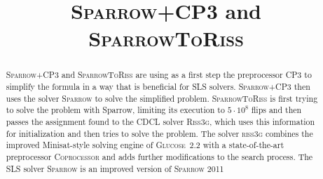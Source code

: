 \documentclass[conference]{IEEEtran}
\begin{document}
	
\title{\textsc{Sparrow+CP3} and \textsc{SparrowToRiss}}


\author{
\and
{}
}



\def\cp{\textsc{Coprocessor}\xspace}
\def\cpt{\textsc{CP3}\xspace}
\def\glucose{\textsc{Glucose~2.2}\xspace}
\def\minisat{\textsc{Minisat~2.2}\xspace}
\def\riss{\textsc{Riss3g}\xspace}
\def\sparrow{\textsc{Sparrow}\xspace}
\def\scp{\textsc{Sparrow+CP3}\xspace}
\def\str{\textsc{SparrowToRiss}\xspace}

\newcommand{\nnote}[1]{$[$\textcolor{darkred}{norbert}:~~\emph{\textcolor{midgrey}{#1}}$]$}

\maketitle

\begin{abstract}
\scp and \str are using as a first step the preprocessor \cpt to simplify the formula in a way that is beneficial for SLS solvers. 
\scp then uses the solver \sparrow to solve the simplified problem.
\str is first trying to solve the problem with Sparrow, limiting its execution to $5\cdot10^8$ flips and then passes the assignment found to the CDCL solver \riss, which uses this information for initialization and then tries to solve the problem.
The solver \textsc{riss3g} combines the improved Minisat-style solving engine of \glucose with a state-of-the-art preprocessor \textsc{Coprocessor} and adds further modifications to the search process.
The SLS solver \sparrow is an improved version of \sparrow2011
\end{abstract}
\end{document}
